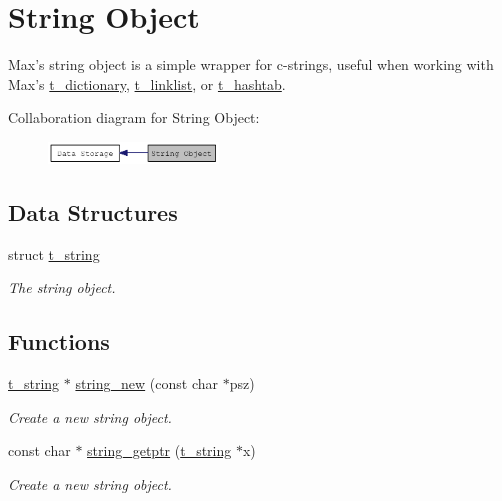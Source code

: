 \hypertarget{group__string}{
\section{String Object}
\label{group__string}
}


Max's string object is a simple wrapper for c-\/strings, useful when working with Max's \hyperlink{structt__dictionary}{t\_\-dictionary}, \hyperlink{structt__linklist}{t\_\-linklist}, or \hyperlink{structt__hashtab}{t\_\-hashtab}.  


Collaboration diagram for String Object:\nopagebreak
\begin{figure}[H]
\begin{center}
\leavevmode
\includegraphics[width=128pt]{group__string}
\end{center}
\end{figure}
\subsection*{Data Structures}
\begin{DoxyCompactItemize}
\item 
struct \hyperlink{structt__string}{t\_\-string}
\begin{DoxyCompactList}\small\item\em The string object. \item\end{DoxyCompactList}\end{DoxyCompactItemize}
\subsection*{Functions}
\begin{DoxyCompactItemize}
\item 
\hyperlink{structt__string}{t\_\-string} $\ast$ \hyperlink{group__string_ga9fce58b43883b838697077fc674a48d9}{string\_\-new} (const char $\ast$psz)
\begin{DoxyCompactList}\small\item\em Create a new string object. \item\end{DoxyCompactList}\item 
const char $\ast$ \hyperlink{group__string_ga1d65f5effcf8d1f77b45f2603280887d}{string\_\-getptr} (\hyperlink{structt__string}{t\_\-string} $\ast$x)
\begin{DoxyCompactList}\small\item\em Create a new string object. \item\end{DoxyCompactList}\end{DoxyCompactItemize}



